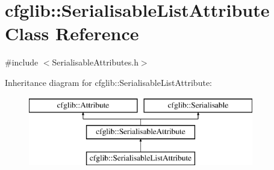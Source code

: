 \hypertarget{classcfglib_1_1SerialisableListAttribute}{}\section{cfglib\+:\+:Serialisable\+List\+Attribute Class Reference}
\label{classcfglib_1_1SerialisableListAttribute}


{\ttfamily \#include $<$Serialisable\+Attributes.\+h$>$}

Inheritance diagram for cfglib\+:\+:Serialisable\+List\+Attribute\+:\begin{figure}[H]
\begin{center}
\leavevmode
\includegraphics[height=3.000000cm]{classcfglib_1_1SerialisableListAttribute}
\end{center}
\end{figure}
